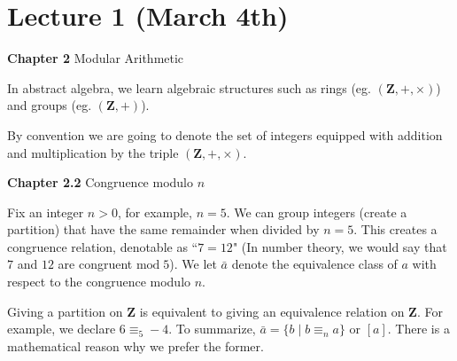 \section{Lecture 1 (March 4th)}
{\bf Chapter 2}\; Modular Arithmetic
\\
\begin{rmk}
In abstract algebra, we learn algebraic structures such as rings (eg. $({\bm Z},+,\times )$) and groups (eg. $({\bm Z},+)$).
\end{rmk}
\vspace{2ex}
\begin{rmk}
By convention we are going to denote the set of integers equipped with addition and multiplication by the triple $({\bm Z},+,\times )$. 

\end{rmk}
\vspace{2ex}
{\bf Chapter 2.2}\; Congruence modulo $n$
\\
\begin{recall}
Fix an integer $n>0$, for example, $n=5$. We can group integers (create a partition) that have the same remainder when divided by $n=5$. This creates a congruence relation, denotable as ``$7=12$" (In number theory, we would say that $7$ and $12$ are congruent $\mathrm{mod}\; 5$). We let $\bar{a}$ denote the equivalence class of $a$ with respect to the congruence modulo $n$.
\end{recall}
\vspace{2ex}
\begin{rmk}
 Giving a partition on ${\bm Z}$ is equivalent to giving an equivalence relation on ${\bm Z}$. For example, we declare $6\equiv_{5} -4$. To summarize, $\bar{a}=\{b\;|\;b\equiv_{n}a\}$ or $[a]$. There is a mathematical reason why we prefer the former.
\end{rmk}
\vspace{2ex}
